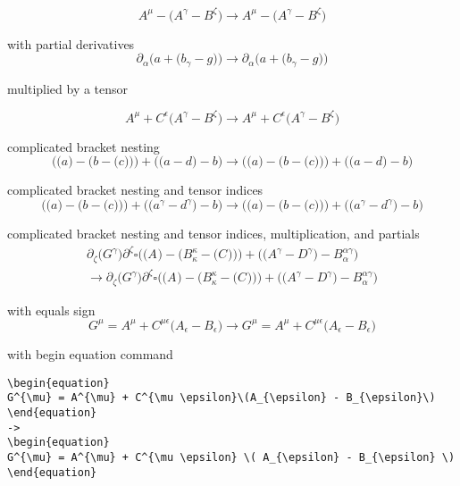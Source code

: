 \documentclass{article}
\def\){\Big)}
\def\({\Big(}
\begin{document}
\begin{equation}
A^{\mu} - \(A^{\gamma} - B^{\zeta}\) 
\rightarrow
A^{\mu} - \( A^{\gamma} - B^{\zeta} \)
\end{equation}


with partial derivatives
\begin{equation}
\partial_{\alpha} \( a +\( b_{\gamma} - g\)\) 
\rightarrow 
\partial_{\alpha} \(a +\( b_{\gamma} -g \)\)
\end{equation}

multiplied by a tensor

\begin{equation}
A^{\mu} + C^{\epsilon}\(A^{\gamma} - B^{\zeta}\) 
\rightarrow
A^{\mu} + C^{\epsilon} \( A^{\gamma} - B^{\zeta} \)
\end{equation}


complicated bracket nesting
\begin{equation}
\(\(a \)- \(b - \(c \)\)\)+\(\(a - d\) - b\) \rightarrow
\(\(a \)- \(b - \(c \)\)\)+\(\(a -d \)-b \)
\end{equation}

complicated bracket nesting and tensor indices
\begin{equation}
\(\(a \)- \(b - \(c \)\)\)+\(\(a^{\gamma} - d^{\gamma}\) - b\) 
\rightarrow
 \(\(a \)- \(b - \(c \)\)\)+\(\( a^{\gamma} - d^{\gamma} \)-b \)
\end{equation}

complicated bracket nesting and tensor indices, multiplication, and partials
\begin{multline}
\partial_{\zeta}\(G^{\gamma} \) \partial^{\zeta} \square \(\(A_{} \)- \(B^{\kappa}_{\kappa} - \(C^{} \)\)\)+\(\(A^{\gamma} - D^{\gamma}\) - B^{\alpha \gamma}_{\alpha}\)  \\
\rightarrow
\partial_{\zeta}\( G^{\gamma} \) \partial^{\zeta} \square \(\( A^{} \)- \( B_{\kappa}^{\kappa} - \( C^{} \)\)\)+\(\( A^{\gamma} - D^{\gamma} \)- B_{\alpha}^{\alpha \gamma} \)
\end{multline}


with equals sign
\begin{equation}
G^{\mu} = A^{\mu} + C^{\mu \epsilon}\(A_{\epsilon} - B_{\epsilon}\) 
\rightarrow
G^{\mu} = A^{\mu} + C^{\mu \epsilon} \( A_{\epsilon} - B_{\epsilon} \)
\end{equation}


with begin equation command
\begin{verbatim}
\begin{equation}
G^{\mu} = A^{\mu} + C^{\mu \epsilon}\(A_{\epsilon} - B_{\epsilon}\) 
\end{equation}
->
\begin{equation}
G^{\mu} = A^{\mu} + C^{\mu \epsilon} \( A_{\epsilon} - B_{\epsilon} \)
\end{equation}
\end{verbatim}
\end{document}

